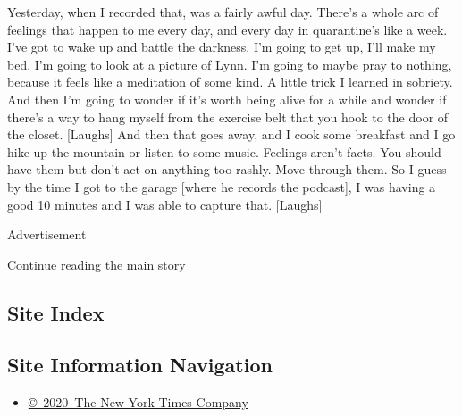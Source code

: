 Yesterday, when I recorded that, was a fairly awful day. There's a whole
arc of feelings that happen to me every day, and every day in
quarantine's like a week. I've got to wake up and battle the darkness.
I'm going to get up, I'll make my bed. I'm going to look at a picture of
Lynn. I'm going to maybe pray to nothing, because it feels like a
meditation of some kind. A little trick I learned in sobriety. And then
I'm going to wonder if it's worth being alive for a while and wonder if
there's a way to hang myself from the exercise belt that you hook to the
door of the closet. {[}Laughs{]} And then that goes away, and I cook
some breakfast and I go hike up the mountain or listen to some music.
Feelings aren't facts. You should have them but don't act on anything
too rashly. Move through them. So I guess by the time I got to the
garage {[}where he records the podcast{]}, I was having a good 10
minutes and I was able to capture that. {[}Laughs{]}

Advertisement

\protect\hyperlink{after-bottom}{Continue reading the main story}

\hypertarget{site-index}{%
\subsection{Site Index}\label{site-index}}

\hypertarget{site-information-navigation}{%
\subsection{Site Information
Navigation}\label{site-information-navigation}}

\begin{itemize}
\tightlist
\item
  \href{https://help.nytimes.com/hc/en-us/articles/115014792127-Copyright-notice}{©~2020~The
  New York Times Company}
\end{itemize}

